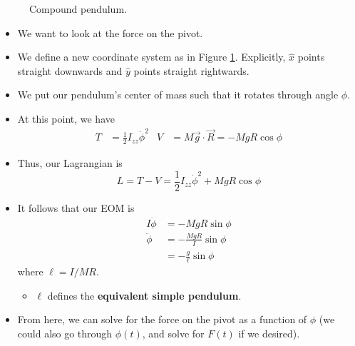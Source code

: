 \documentclass[../notes.tex]{subfiles}
\begin{document}
\begin{itemize}
\begin{figure}[h!]
        \caption{Compound pendulum.}
        \label{fig:compoundPendulum}
    \end{figure}
    \begin{itemize}
        \item We want to look at the force on the pivot.
        \item We define a new coordinate system as in Figure \ref{fig:compoundPendulum}. Explicitly, $\hat{x}$ points straight downwards and $\hat{y}$ points straight rightwards.
        \item We put our pendulum's center of mass such that it rotates through angle $\phi$.
        \item At this point, we have
        \begin{align*}
            T &= \frac{1}{2}I_{zz}\dot{\phi}^2&
            V &= M\vec{g}\cdot\vec{R} = -MgR\cos\phi
        \end{align*}
        \item Thus, our Lagrangian is
        \begin{equation*}
            L = T-V = \frac{1}{2}I_{zz}\dot{\phi}^2+MgR\cos\phi
        \end{equation*}
        \item It follows that our EOM is
        \begin{align*}
            I\ddot{\phi} &= -MgR\sin\phi\\
            \ddot{\phi} &= -\frac{MgR}{I}\sin\phi\\
            &= -\frac{g}{\ell}\sin\phi
        \end{align*}
        where $\ell=I/MR$.
        \begin{itemize}
            \item $\ell$ defines the \textbf{equivalent simple pendulum}.
        \end{itemize}
        \item From here, we can solve for the force on the pivot as a function of $\phi$ (we could also go through $\phi(t)$, and solve for $F(t)$ if we desired).
        \begin{itemize}

\end{itemize}
\end{itemize}
\end{itemize}
\end{document}
